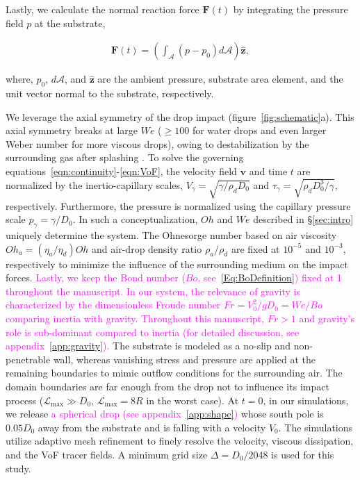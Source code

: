\documentclass{jfm}
\newcommand{\Rev}[1]{\todo[color=orange, bordercolor=none, textcolor=white]{R2}\textcolor{magenta}{#1}}
\begin{document}
\noindent Lastly, we calculate the normal reaction force $\boldsymbol{F}(t)$ by integrating the pressure field $p$ at the substrate,

\begin{align}\label{Eqn:ReactionForce}
	\boldsymbol{F}(t) = \left(\int_\mathcal{A} \left(p-p_0\right)d\mathcal{A}\right)\hat{\boldsymbol{z}},
\end{align}

\noindent where, $p_0$, $d\mathcal{A}$, and $\hat{\boldsymbol{z}}$ are the ambient pressure, substrate area element, and the unit vector normal to the substrate, respectively. 

We leverage the axial symmetry of the drop impact (figure~\ref{fig:schematic}a). This axial symmetry breaks at large $We$ ($\ge 100$ for water drops and even larger Weber number for more viscous drops), owing to destabilization by the surrounding gas after splashing \citep{xu2005drop, Eggers2010, Driscoll2011, riboux2014experiments, Josserand2016, zhang2022impact}. 
To solve the governing equations~\eqref{eqn:continuity}-\eqref{eqn:VoF}, the velocity field $\boldsymbol{v}$ and time $t$ are normalized by the inertio-capillary scales, $V_\gamma = \sqrt{\gamma/\rho_dD_0}$ and $\tau_\gamma = \sqrt{\rho_dD_0^3/\gamma}$, respectively. Furthermore, the pressure is normalized using the capillary pressure scale $p_\gamma = \gamma/D_0$. In such a conceptualization, $Oh$ and $We$ described in \S\ref{sec:intro} uniquely determine the system. 
The Ohnesorge number based on air viscosity $Oh_a = \left(\eta_a/\eta_d\right)Oh$ and air-drop density ratio $\rho_a/\rho_d$ are fixed at $10^{-5}$ and $10^{-3}$, respectively to minimize the influence of the surrounding medium on the impact forces. 
\Rev{Lastly, we keep the Bond number ($Bo$, see~\eqref{Eq:BoDefinition}) fixed at 1 throughout the manuscript. In our system, the relevance of gravity is characterized by the dimensionless Froude number $Fr = V_0^2/gD_0 = We/Bo$ comparing inertia with gravity. Throughout this manuscript, $Fr > 1$ and gravity's role is sub-dominant compared to inertia (for detailed discussion, see appendix~\ref{app:gravity}).}
The substrate is modeled as a no-slip and non-penetrable wall, whereas vanishing stress and pressure are applied at the remaining boundaries to mimic outflow conditions for the surrounding air. The domain boundaries are far enough from the drop not to influence its impact process ($\mathcal{L}_\text{max} \gg D_0$, $\mathcal{L}_\text{max} = 8R$ in the worst case). At $t = 0$, in our simulations, we release \Rev{a spherical drop (see appendix~\ref{app:shape})} whose south pole is $0.05D_0$ away from the substrate and is falling with a velocity $V_0$. The simulations utilize adaptive mesh refinement to finely resolve the velocity, viscous dissipation, and the VoF tracer fields. A minimum grid size $\Delta = D_0/2048$ is used for this study. 
\end{document}
